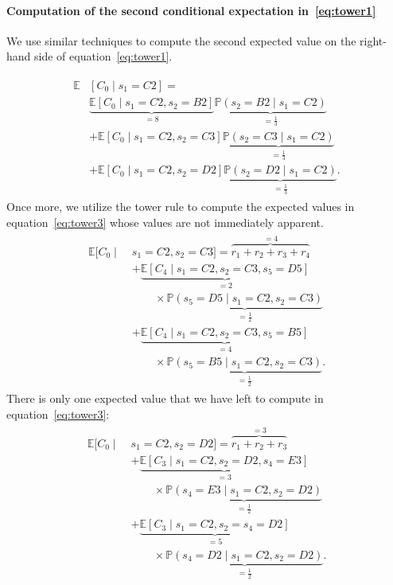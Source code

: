 \paragraph{Computation of the second conditional expectation
in~\eqref{eq:tower1}} 
%
We use similar techniques to compute the second expected value on the right-hand
side of equation~\eqref{eq:tower1}.
%

\begin{align}
    \begin{split}
    \mathbb{E}&\left[ C_0 \mid s_1 = C2 \right] = \\
    &\underbrace{\mathbb{E}[C_0 \mid s_1 = C2, s_2 = B2]}_{=8} \underbrace{\mathbb{P}(s_2 = B2 \mid s_1 = C2)}_{=\frac{1}{3}} \\
    &+ \mathbb{E}[C_0 \mid s_1=C2, s_2 = C3] \underbrace{\mathbb{P}(s_2 = C3 \mid s_1 = C2)}_{=\frac{1}{3}} \\
    &+ \mathbb{E}[C_0 \mid s_1 = C2, s_2 = D2] \underbrace{\mathbb{P}(s_2 = D2 \mid s_1 = C2)}_{=\frac{1}{3}}.
    \end{split}
    \label{eq:tower3}
\end{align}
%
Once more, we utilize the tower rule to compute the expected values in
equation~\eqref{eq:tower3} whose values are not immediately apparent.
%
\begin{align*}
    \begin{split}
    \mathbb{E}[C_0 \mid \; &s_1=C2, s_2=C3] = \overbrace{r_1 + r_2 + r_3 + r_4}^{=4} \\
    &+ \underbrace{\mathbb{E}[C_4 \mid s_1=C2, s_2=C3, s_5=D5]}_{=2} \\ &{\phantom{1234}}\times \underbrace{\mathbb{P}(s_5=D5 \mid s_1=C2, s_2=C3)}_{=\frac{1}{2}} \\
    &+ \underbrace{\mathbb{E}[C_4 \mid s_1=C2, s_2=C3, s_5=B5]}_{=4} \\ &{\phantom{1234}} \times \underbrace{\mathbb{P}(s_5=B5 \mid s_1=C2, s_2=C3)}_{=\frac{1}{2}}.
    \end{split}
\end{align*}
%
There is only one expected value that we have left to compute in
equation~\eqref{eq:tower3}:
%
\vspace{-2mm}
\begin{align*}
    \begin{split}
    \mathbb{E}[C_0 \mid \; &s_1=C2, s_2=D2] = \overbrace{r_1 + r_2 + r_3}^{=3} \\
    &+ \underbrace{\mathbb{E}[C_3 \mid s_1=C2, s_2=D2, s_4=E3]}_{=3} \\ &{\phantom{1234}}\times \underbrace{\mathbb{P}(s_4=E3 \mid s_1=C2, s_2=D2)}_{=\frac{1}{2}} \\
    &+ \underbrace{\mathbb{E}[C_3 \mid s_1=C2, s_2=s_4=D2]}_{=5} \\ &{\phantom{1234}}\times \underbrace{\mathbb{P}(s_4=D2 \mid s_1=C2, s_2=D2)}_{=\frac{1}{2}}.
    \end{split}
\end{align*}
